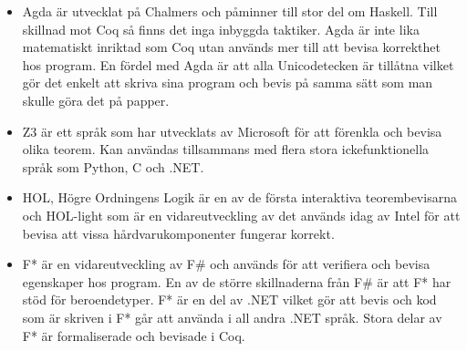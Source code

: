 \begin{itemize}
\item Agda är utvecklat på Chalmers och påminner till stor del om Haskell. Till
skillnad mot Coq så finns det inga inbyggda taktiker. Agda är inte lika
matematiskt inriktad som Coq utan används mer till att bevisa korrekthet hos
program. En fördel med Agda är att alla Unicodetecken är tillåtna vilket gör
det enkelt att skriva sina program och bevis på samma sätt som man skulle göra
det på papper.

\item Z3 är ett språk som har utvecklats av Microsoft för att förenkla och
bevisa olika teorem. Kan användas tillsammans med flera stora ickefunktionella
språk som Python, C och .NET.

\item HOL, Högre Ordningens Logik är en av de första interaktiva
teorembevisarna och HOL-light som är en vidareutveckling av det används idag av
Intel för att bevisa att vissa hårdvarukomponenter fungerar korrekt.

\item F* är en vidareutveckling av F\# och används för att verifiera och bevisa
egenskaper hos program. En av de större skillnaderna från F\# är att F* har
stöd för beroendetyper. F* är en del av .NET vilket gör att bevis och kod som
är skriven i F* går att använda i all andra .NET språk. Stora delar av F* är
formaliserade och bevisade i Coq.
\end{itemize}

\begin{comment}
Källor och annat material
HOL http://www.cl.cam.ac.uk/~jrh13/hol-light/
Z3 http://research.microsoft.com/en-us/um/redmond/projects/z3/old/
F* http://research.microsoft.com/en-us/projects/fstar/
\end{comment}
